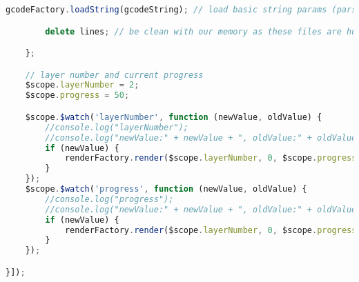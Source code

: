 \begin{lstlisting}[language=JavaScript, label={lst:viewer}, caption=This file takes in all requests for parsing gcode and for canvas frames to the main page.]
        gcodeFactory.loadString(gcodeString); // load basic string params (parse header)

        delete lines; // be clean with our memory as these files are huge

    };

    // layer number and current progress
    $scope.layerNumber = 2;
    $scope.progress = 50;

    $scope.$watch('layerNumber', function (newValue, oldValue) {
        //console.log("layerNumber");
        //console.log("newValue:" + newValue + ", oldValue:" + oldValue);
        if (newValue) {
            renderFactory.render($scope.layerNumber, 0, $scope.progress);
        }
    });
    $scope.$watch('progress', function (newValue, oldValue) {
        //console.log("progress");
        //console.log("newValue:" + newValue + ", oldValue:" + oldValue);
        if (newValue) {
            renderFactory.render($scope.layerNumber, 0, $scope.progress);
        }
    });

}]);
\end{lstlisting}

